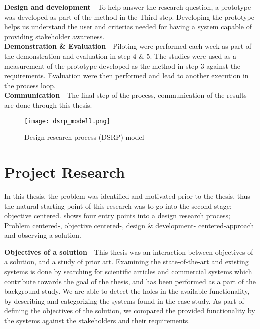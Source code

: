 \textbf{Design and development} - To help answer the research question, a prototype was developed as part of the 
method in the Third step. Developing the prototype helps us understand the 
user and criterias needed for having a system capable of providing stakeholder 
awareness.\\

\textbf{Demonstration \& Evaluation} - Piloting were performed each week as part of the demonstration and
evaluation in step 4 \& 5. The studies were used as a measurement of the prototype developed
as the method in step 3 against the requirements. Evaluation were then
performed and lead to another execution in the process loop.\\


\textbf{Communication} - The final step of the process, communication of the results are done through this thesis.

\begin{figure}[!htbp]
	\texttt{[image: dsrp\_modell.png]}
	\caption[Design science research process (DSRP) model]{Design research process (DSRP)
	model\cite{peffers2006design}}
	\label{fig:DSRP}
\end{figure}



\section{Project Research} %
\label{sec:project_research}
In this thesis, the problem was 
identified and motivated prior to the thesis, thus the natural starting 
point of this research was to go into the second stage; objective 
centered.  shows four entry points into a design 
research process; Problem centered-, objective centered-, design \& development-
centered-approach and observing a solution. 

\textbf{Objectives of a solution} - This thesis was an interaction between objectives of a solution, and a study 
of prior art. Examining the state-of-the-art and existing systems is done by 
searching for scientific articles and commercial systems which contribute 
towards the goal of the thesis, and has been performed as a part of the 
background study. We are able to detect the holes in the available 
functionality, by describing and categorizing the systems found in the case 
study. As part of defining the objectives of the solution, we compared the 
provided functionality by the systems against the stakeholders and their 
requirements.\\

